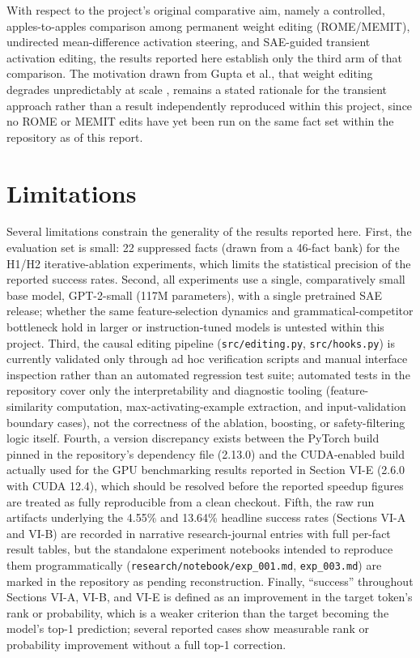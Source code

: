 \documentclass[conference]{IEEEtran}
\begin{document}
With respect to the project's original comparative aim, namely a controlled, apples-to-apples comparison among permanent weight editing (ROME/MEMIT), undirected mean-difference activation steering, and SAE-guided transient activation editing, the results reported here establish only the third arm of that comparison. The motivation drawn from Gupta et al., that weight editing degrades unpredictably at scale \cite{gupta2024forgetting}, remains a stated rationale for the transient approach rather than a result independently reproduced within this project, since no ROME or MEMIT edits have yet been run on the same fact set within the repository as of this report.

\section{Limitations}

Several limitations constrain the generality of the results reported here. First, the evaluation set is small: 22 suppressed facts (drawn from a 46-fact bank) for the H1/H2 iterative-ablation experiments, which limits the statistical precision of the reported success rates. Second, all experiments use a single, comparatively small base model, GPT-2-small (117M parameters), with a single pretrained SAE release; whether the same feature-selection dynamics and grammatical-competitor bottleneck hold in larger or instruction-tuned models is untested within this project. Third, the causal editing pipeline (\texttt{src/editing.py}, \texttt{src/hooks.py}) is currently validated only through ad hoc verification scripts and manual interface inspection rather than an automated regression test suite; automated tests in the repository cover only the interpretability and diagnostic tooling (feature-similarity computation, max-activating-example extraction, and input-validation boundary cases), not the correctness of the ablation, boosting, or safety-filtering logic itself. Fourth, a version discrepancy exists between the PyTorch build pinned in the repository's dependency file (2.13.0) and the CUDA-enabled build actually used for the GPU benchmarking results reported in Section VI-E (2.6.0 with CUDA 12.4), which should be resolved before the reported speedup figures are treated as fully reproducible from a clean checkout. Fifth, the raw run artifacts underlying the 4.55\% and 13.64\% headline success rates (Sections VI-A and VI-B) are recorded in narrative research-journal entries with full per-fact result tables, but the standalone experiment notebooks intended to reproduce them programmatically (\texttt{research/notebook/exp\_001.md}, \texttt{exp\_003.md}) are marked in the repository as pending reconstruction. Finally, ``success'' throughout Sections VI-A, VI-B, and VI-E is defined as an improvement in the target token's rank or probability, which is a weaker criterion than the target becoming the model's top-1 prediction; several reported cases show measurable rank or probability improvement without a full top-1 correction.
\end{document}
